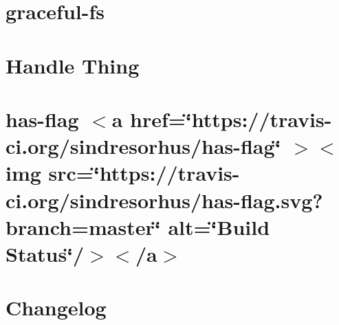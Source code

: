 \documentclass[twoside]{book}
\newcommand{\+}{\discretionary{\mbox{\scriptsize$\hookleftarrow$}}{}{}}
\begin{document}
\chapter{graceful-\/fs}
\label{md__c___users_vaishnavi_jadhav__desktop__developer_code_mean_stack_example_client_node_modules_graceful_fs__r_e_a_d_m_e}

\chapter{Handle Thing}
\label{md__c___users_vaishnavi_jadhav__desktop__developer_code_mean_stack_example_client_node_modules_handle_thing__r_e_a_d_m_e}

\chapter{has-\/flag \texorpdfstring{$<$}{<}a href=\char`\"{}https\+://travis-\/ci.\+org/sindresorhus/has-\/flag\char`\"{} \texorpdfstring{$>$}{>}\texorpdfstring{$<$}{<}img src=\char`\"{}https\+://travis-\/ci.\+org/sindresorhus/has-\/flag.\+svg?branch=master\char`\"{} alt=\char`\"{}\+Build Status\char`\"{}/\texorpdfstring{$>$}{>}\texorpdfstring{$<$}{<}/a\texorpdfstring{$>$}{>}}
\label{md__c___users_vaishnavi_jadhav__desktop__developer_code_mean_stack_example_client_node_modules_has_flag_readme}

\chapter{Changelog}
\label{md__c___users_vaishnavi_jadhav__desktop__developer_code_mean_stack_example_client_node_modules_has_symbols__c_h_a_n_g_e_l_o_g}

\end{document}
